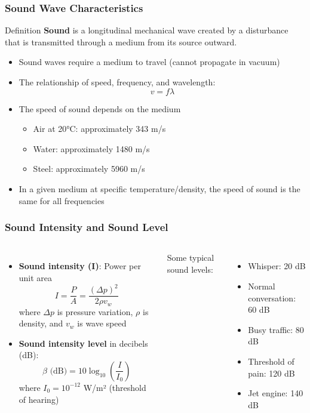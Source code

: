 \documentclass{beamer}
\begin{document}
\begin{frame}
\frametitle{Sound Wave Characteristics}
\begin{block}{Definition}
\textbf{Sound} is a longitudinal mechanical wave created by a disturbance that is transmitted through a medium from its source outward.
\end{block}

\begin{itemize}
\item Sound waves require a medium to travel (cannot propagate in vacuum)
\item The relationship of speed, frequency, and wavelength:
\begin{equation}
v = f\lambda
\end{equation}
\item The speed of sound depends on the medium
\begin{itemize}
\item Air at 20°C: approximately 343 m/s
\item Water: approximately 1480 m/s
\item Steel: approximately 5960 m/s
\end{itemize}
\item In a given medium at specific temperature/density, the speed of sound is the same for all frequencies
\end{itemize}
\end{frame}

\begin{frame}
\frametitle{Sound Intensity and Sound Level}
\begin{columns}
\begin{itemize}
\item \textbf{Sound intensity (I)}: Power per unit area
\begin{equation}
I = \frac{P}{A} = \frac{(\Delta p)^2}{2\rho v_w}
\end{equation}
where $\Delta p$ is pressure variation, $\rho$ is density, and $v_w$ is wave speed

\item \textbf{Sound intensity level} in decibels (dB):
\begin{equation}
\beta \text{ (dB)} = 10 \log_{10}\left(\frac{I}{I_0}\right)
\end{equation}
where $I_0 = 10^{-12}$ W/m² (threshold of hearing)
\end{itemize}

Some typical sound levels:
\begin{itemize}
\item Whisper: 20 dB
\item Normal conversation: 60 dB
\item Busy traffic: 80 dB
\item Threshold of pain: 120 dB
\item Jet engine: 140 dB
\end{itemize}
\end{columns}
\end{frame}
\end{document}

